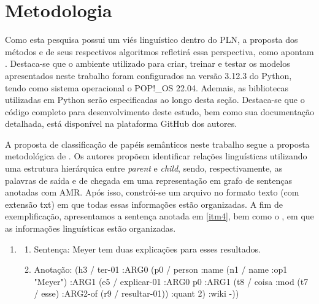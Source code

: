 \section{Metodologia}\label{sec-metologia}

Como esta pesquisa possui um viés linguístico dentro do PLN, a proposta
dos métodos e de seus respectivos algoritmos refletirá essa perspectiva,
como apontam \textcite{rodrigues2022}. Destaca-se que o ambiente
utilizado para criar, treinar e testar os modelos apresentados neste
trabalho foram configurados na versão 3.12.3 do Python, tendo como
sistema operacional o POP!\_OS 22.04. Ademais, as bibliotecas utilizadas
em Python serão especificadas ao longo desta seção. Destaca-se que o
código completo para desenvolvimento deste estudo, bem como sua
documentação detalhada, está disponível na plataforma GitHub dos
autores.

A proposta de classificação de papéis semânticos neste trabalho segue a
proposta metodológica de \textcite{ilmy2021}. Os autores propõem
identificar relações linguísticas utilizando uma estrutura hierárquica
entre \emph{parent} e \emph{child}, sendo, respectivamente, as palavras
de saída e de chegada em uma representação em grafo de sentenças
anotadas com AMR. Após isso, constrói-se um arquivo no formato texto
(com extensão txt) em que todas essas informações estão organizadas. A
fim de exemplificação, apresentamos a sentença anotada em \ref{itm4}, bem como
o , em que as informações linguísticas estão organizadas.

\begin{enumerate}[start=4,label={(\arabic{enumi})}]
  \item\label{itm4}
    \begin{enumerate}[label=(\arabic{enumi}.\alph*)]
      \item\label{itm4a} Sentença: Meyer tem duas explicações para esses resultados.
      \item\label{itm4b} Anotação: (h3 / ter-01 :ARG0 (p0 / person :name (n1 / name :op1
  "Meyer") :ARG1 (e5 / explicar-01 :ARG0 p0 :ARG1 (t8 / coisa :mod (t7 /
  esse) :ARG2-of (r9 / resultar-01)) :quant 2) :wiki -))
    \end{enumerate}
\end{enumerate}


